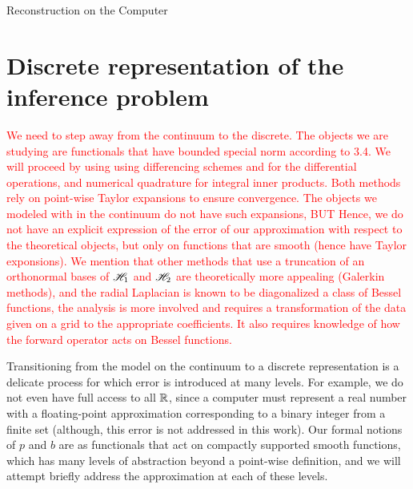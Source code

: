 \begin{chapter}{Reconstruction on the Computer}
\section{Discrete representation of the inference problem} \label{sec:discretization}

\textcolor{red}{
  We need to step away from the continuum to the discrete.
  The objects we are studying are functionals that have bounded special norm according to 3.4.
  We will proceed by using using differencing schemes and for the differential operations, and numerical quadrature for integral inner products.
  Both methods rely on point-wise Taylor expansions to ensure convergence.
  The objects we modeled with in the continuum do not have such expansions, 
  BUT
  Hence, we do not have an explicit expression of the error of our approximation with respect to the theoretical objects, but only on functions that are smooth (hence have Taylor exponsions).
  We mention that other methods that use a truncation of an orthonormal bases of $\mathscr H _1$ and $\mathscr H_2$ are theoretically more appealing (Galerkin methods), and the radial Laplacian is known to be diagonalized a class of Bessel functions, the analysis is more involved and requires a transformation of the data given on a grid to the appropriate coefficients.
  It also requires knowledge of how the forward operator acts on Bessel functions.
}

Transitioning from the model on the continuum to a discrete representation is a delicate process for which error is introduced at many levels.  
For example, we do not even have full access to all $\mathbb R$, since a computer must represent a real number with a floating-point approximation corresponding to a binary integer from a finite set (although, this error is not addressed in this work). 
Our formal notions of $p$ and $b$ are as functionals that act on compactly supported smooth functions, which has many levels of abstraction beyond a point-wise definition, and we will attempt briefly address the approximation at each of these levels.


\end{chapter}
